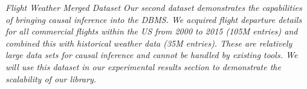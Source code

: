 \begin{example} \em Flight Weather Merged Dataset
\label{ex:flights}
Our second dataset demonstrates the capabilities of bringing causal inference
into the DBMS.
We acquired flight departure details for all commercial flights
within the US from 2000 to 2015 (105M entries)
and combined this with historical weather data (35M entries).
These are relatively large data sets for causal inference and cannot be handled
by existing tools.
We will use this dataset in our experimental results section to demonstrate
the scalability of our library.
\end{example}

